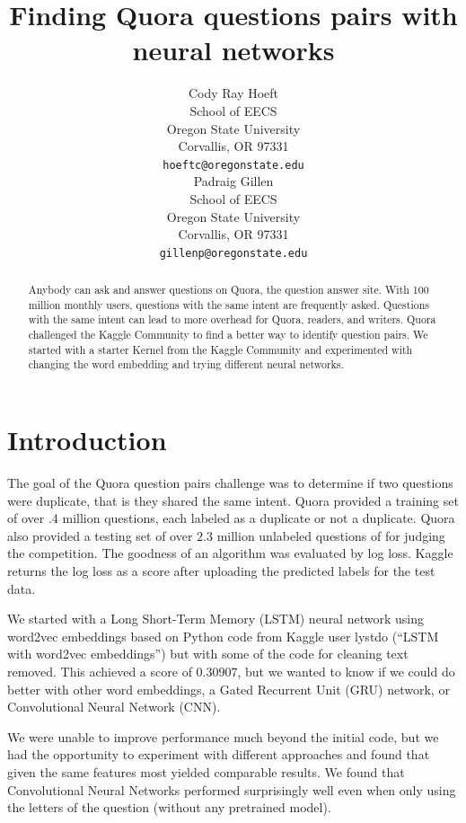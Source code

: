 \documentclass{article}
\title{Finding Quora questions pairs with neural networks}
\author{
    Cody Ray Hoeft \\
    School of EECS \\
    Oregon State University \\
    Corvallis, OR 97331 \\
    \texttt{hoeftc@oregonstate.edu} \\
    \And
    Padraig Gillen \\
    School of EECS \\
    Oregon State University \\
    Corvallis, OR 97331 \\
    \texttt{gillenp@oregonstate.edu} \\
}
\begin{document}

\maketitle

\begin{abstract}
    Anybody can ask and answer questions on Quora, the question answer site. With 100 million monthly users, questions with the same intent are frequently asked. Questions with the same intent can lead to more overhead for Quora, readers, and writers. Quora challenged the Kaggle Community to find a better way to identify question pairs. We started with a starter Kernel from the Kaggle Community and experimented with changing the word embedding and trying different neural networks.
\end{abstract}

\section{Introduction}

	The goal of the Quora question pairs challenge was to determine if two questions were duplicate, that is they shared the same intent. Quora provided a training set of over $.4$ million questions, each labeled as a duplicate or not a duplicate. Quora also provided a testing set of over $2.3$ million unlabeled questions of for judging the competition. The goodness of an algorithm was evaluated by log loss. Kaggle returns the log loss as a score after uploading the predicted labels for the test data.
    
    We started with a Long Short-Term Memory (LSTM) neural network using word2vec embeddings based on Python code from Kaggle user lystdo (``LSTM with word2vec embeddings'') but with some of the code for cleaning text removed. This achieved a score of $0.30907$, but we wanted to know if we could do better with other word embeddings, a Gated Recurrent Unit (GRU) network, or Convolutional Neural Network (CNN).
    
    We were unable to improve performance much beyond the initial code, but we had the opportunity to experiment with different approaches and found that given the same features most yielded comparable results. We found that Convolutional Neural Networks performed surprisingly well even when only using the letters of the question (without any pretrained model).
\end{document}

